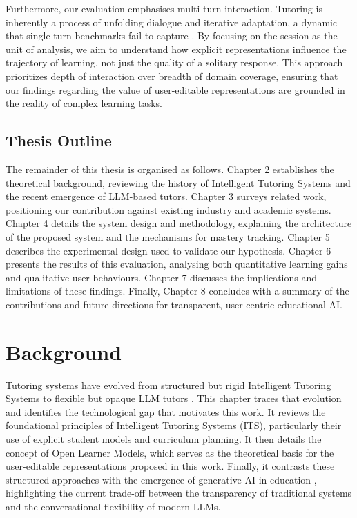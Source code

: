\documentclass[logo,bsc,singlespacing,parskip,online]{infthesis}
\begin{document}
Furthermore, our evaluation emphasises multi-turn interaction. Tutoring is inherently a process of unfolding dialogue and iterative adaptation, a dynamic that single-turn benchmarks fail to capture \citep{srinivasa2025tutorbench}. By focusing on the session as the unit of analysis, we aim to understand how explicit representations influence the trajectory of learning, not just the quality of a solitary response. This approach prioritizes depth of interaction over breadth of domain coverage, ensuring that our findings regarding the value of user-editable representations are grounded in the reality of complex learning tasks.

\section{Thesis Outline}

The remainder of this thesis is organised as follows. Chapter 2 establishes the theoretical background, reviewing the history of Intelligent Tutoring Systems and the recent emergence of LLM-based tutors. Chapter 3 surveys related work, positioning our contribution against existing industry and academic systems. Chapter 4 details the system design and methodology, explaining the architecture of the proposed system and the mechanisms for mastery tracking. Chapter 5 describes the experimental design used to validate our hypothesis. Chapter 6 presents the results of this evaluation, analysing both quantitative learning gains and qualitative user behaviours. Chapter 7 discusses the implications and limitations of these findings. Finally, Chapter 8 concludes with a summary of the contributions and future directions for transparent, user-centric educational AI. 


\chapter{Background}

Tutoring systems have evolved from structured but rigid Intelligent Tutoring Systems to flexible but opaque LLM tutors \citep{anderson1985its,wenger1987aits}. This chapter traces that evolution and identifies the technological gap that motivates this work. It reviews the foundational principles of Intelligent Tutoring Systems (ITS), particularly their use of explicit student models and curriculum planning. It then details the concept of Open Learner Models, which serves as the theoretical basis for the user-editable representations proposed in this work. Finally, it contrasts these structured approaches with the emergence of generative AI in education \citep{holmes2019aied}, highlighting the current trade-off between the transparency of traditional systems and the conversational flexibility of modern LLMs.
\end{document}
